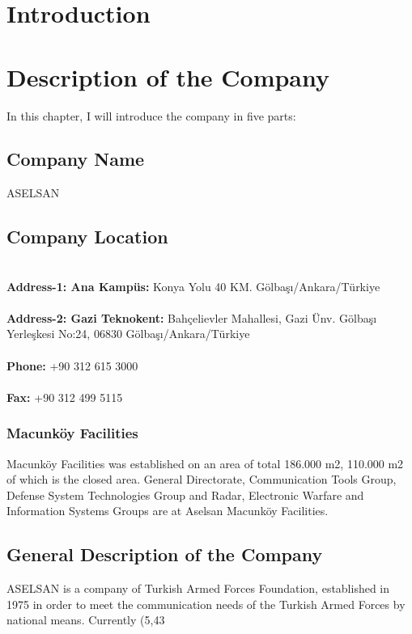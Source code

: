 \tableofcontents
\newpage



\section{Introduction}
\-
\indent 



\section{Description of the Company}
\- \indent
In this chapter, I will introduce the company in five parts:



\subsection{Company Name}
\-
\indent ASELSAN


\subsection{Company Location}
\-
\\
\textbf{ Address-1: Ana Kampüs:} Konya Yolu 40 KM. Gölbaşı/Ankara/Türkiye 
\\
\\
\textbf{ Address-2: Gazi Teknokent:} Bahçelievler Mahallesi, Gazi Ünv. Gölbaşı Yerleşkesi No:24, 06830 Gölbaşı/Ankara/Türkiye 
\\
\\
\textbf{ Phone:} +90 312 615 3000
\\
\\
\textbf{ Fax:} +90 312 499 5115

\subsubsection{Macunköy Facilities}
\- \indent

	Macunköy Facilities was established on an area of total 186.000 m2, 110.000 m2 of which is the closed area. General Directorate, Communication Tools Group, Defense System Technologies Group and Radar, Electronic Warfare and Information Systems Groups are at Aselsan Macunköy Facilities.​ 

\subsection{General Description of the Company}
\-
\indent ASELSAN is a company of Turkish Armed Forces Foundation, established in 1975 in order to meet the communication needs of the Turkish Armed Forces by national means. Currently (5,43%

